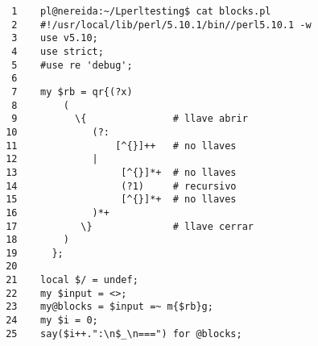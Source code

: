 \begin{latexonly}
\begin{verbatim}
  1    pl@nereida:~/Lperltesting$ cat blocks.pl
  2    #!/usr/local/lib/perl/5.10.1/bin//perl5.10.1 -w
  3    use v5.10;
  4    use strict;
  5    #use re 'debug';
  6    
  7    my $rb = qr{(?x)
  8        (
  9          \{               # llave abrir
 10             (?:
 11                 [^{}]++   # no llaves
 12             |
 13                  [^{}]*+  # no llaves
 14                  (?1)     # recursivo
 15                  [^{}]*+  # no llaves
 16             )*+
 17           \}              # llave cerrar
 18        )
 19      };
 20    
 21    local $/ = undef;
 22    my $input = <>;
 23    my@blocks = $input =~ m{$rb}g;
 24    my $i = 0;
 25    say($i++.":\n$_\n===") for @blocks;
\end{verbatim}
\end{latexonly}
